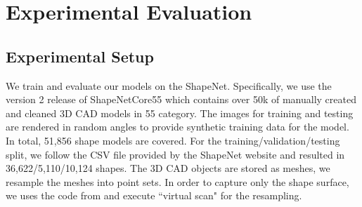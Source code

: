\section{Experimental Evaluation}
\subsection{Experimental Setup}
We train and evaluate our models on the ShapeNet\cite{shapenetdata}. Specifically, we use the version 2 release of ShapeNetCore55 which contains over 50k of
manually created and cleaned 3D CAD models in 55 category.
The images for training
and testing are rendered in random angles to provide synthetic training data for the model. In total,
51,856 shape models are covered. For the training/validation/testing split, we follow the CSV file provided by the ShapeNet website and resulted in 36,622/5,110/10,124 shapes. The 3D CAD objects are
stored as meshes, we resample the meshes into point sets. In order to capture only the shape surface, we uses the code from \cite{Wang-2017-OCNN} and execute ``virtual scan" for the resampling.
